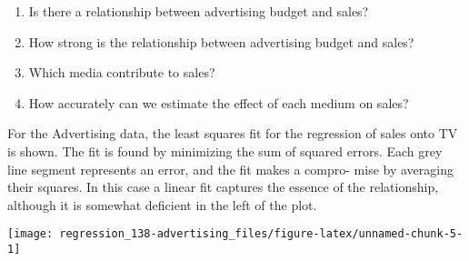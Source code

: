 \documentclass[]{book}
\newenvironment{Shaded}{\begin{snugshade}}{\end{snugshade}}
\newcommand{\DataTypeTok}[1]{\textcolor[rgb]{0.13,0.29,0.53}{#1}}
\newcommand{\DecValTok}[1]{\textcolor[rgb]{0.00,0.00,0.81}{#1}}
\newcommand{\KeywordTok}[1]{\textcolor[rgb]{0.13,0.29,0.53}{\textbf{#1}}}
\newcommand{\NormalTok}[1]{#1}
\newcommand{\OperatorTok}[1]{\textcolor[rgb]{0.81,0.36,0.00}{\textbf{#1}}}
\newcommand{\StringTok}[1]{\textcolor[rgb]{0.31,0.60,0.02}{#1}}
\begin{document}
\begin{enumerate}
\def\labelenumi{\arabic{enumi}.}
\item
  Is there a relationship between advertising budget and sales?
\item
  How strong is the relationship between advertising budget and sales?
\item
  Which media contribute to sales?
\item
  How accurately can we estimate the eﬀect of each medium on sales?
\end{enumerate}

For the Advertising data, the least squares fit for the regression
of sales onto TV is shown. The fit is found by minimizing the sum of squared
errors. Each grey line segment represents an error, and the fit makes a compro-
mise by averaging their squares. In this case a linear fit captures the essence of
the relationship, although it is somewhat deficient in the left of the plot.

\begin{Shaded}
\end{Shaded}

\begin{center}\texttt{[image: regression\_138-advertising\_files/figure-latex/unnamed-chunk-5-1]} \end{center}
\end{document}
